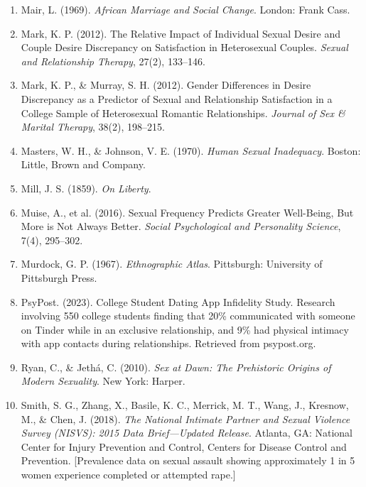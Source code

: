\documentclass[12pt,openany]{book}
\numberwithin{equation}{chapter}
\begin{document}
\begin{enumerate}
    \item Mair, L. (1969). \textit{African Marriage and Social Change}. London: Frank Cass.
    
    \item Mark, K. P. (2012). The Relative Impact of Individual Sexual Desire and Couple Desire Discrepancy on Satisfaction in Heterosexual Couples. \textit{Sexual and Relationship Therapy}, 27(2), 133--146.
    
    \item Mark, K. P., \& Murray, S. H. (2012). Gender Differences in Desire Discrepancy as a Predictor of Sexual and Relationship Satisfaction in a College Sample of Heterosexual Romantic Relationships. \textit{Journal of Sex \& Marital Therapy}, 38(2), 198--215.
    
    \item Masters, W. H., \& Johnson, V. E. (1970). \textit{Human Sexual Inadequacy}. Boston: Little, Brown and Company.
    
    \item Mill, J. S. (1859). \textit{On Liberty}.
    
    \item Muise, A., et al. (2016). Sexual Frequency Predicts Greater Well-Being, But More is Not Always Better. \textit{Social Psychological and Personality Science}, 7(4), 295--302.
    
    \item Murdock, G. P. (1967). \textit{Ethnographic Atlas}. Pittsburgh: University of Pittsburgh Press.
    
    \item PsyPost. (2023). College Student Dating App Infidelity Study. Research involving 550 college students finding that 20\% communicated with someone on Tinder while in an exclusive relationship, and 9\% had physical intimacy with app contacts during relationships. Retrieved from psypost.org.
    
    \item Ryan, C., \& Jeth\'{a}, C. (2010). \textit{Sex at Dawn: The Prehistoric Origins of Modern Sexuality}. New York: Harper.
    
    \item Smith, S. G., Zhang, X., Basile, K. C., Merrick, M. T., Wang, J., Kresnow, M., \& Chen, J. (2018). \textit{The National Intimate Partner and Sexual Violence Survey (NISVS): 2015 Data Brief---Updated Release}. Atlanta, GA: National Center for Injury Prevention and Control, Centers for Disease Control and Prevention. [Prevalence data on sexual assault showing approximately 1 in 5 women experience completed or attempted rape.]
    

\end{enumerate}
\end{document}
